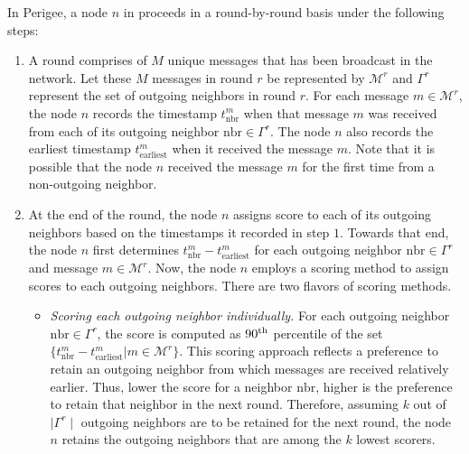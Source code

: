 \documentclass{article}
\begin{document}
In {\sf Perigee}, a node $n$ in proceeds in a round-by-round basis under the following steps:
\begin{enumerate}
    \item A round comprises of $M$ unique messages that has been broadcast in the network. Let these $M$ messages in round $r$ be represented by $\mathcal{M}^r$ and $\Gamma^r$ represent the set of outgoing neighbors in round $r$. For each message $m \in \mathcal{M}^r$, the node $n$ records the timestamp $t^m_{\text{nbr}}$ when that message $m$ was received from each of its outgoing neighbor $\text{nbr} \in \Gamma^r$. The node $n$ also records the earliest timestamp $t^m_{\text{earliest}}$ when it received the message $m$. Note that it is possible that the node $n$ received the message $m$ for the first time from a non-outgoing neighbor.
    \item At the end of the round, the node $n$ assigns score to each of its outgoing neighbors based on the timestamps it recorded in step $1$. Towards that end, the node $n$ first determines $t^m_{\text{nbr}} - t^m_{\text{earliest}}$ for each outgoing neighbor $\text{nbr} \in \Gamma^r$ and message $m \in \mathcal{M}^r$. Now, the node $n$ employs a scoring method to assign scores to each outgoing neighbors. There are two flavors of scoring methods. 
    \begin{itemize}
        \item \textit{Scoring each outgoing neighbor individually.} For each outgoing neighbor $\text{nbr} \in \Gamma^r$, the score is computed as $90\textsuperscript{th}$ percentile of the set $\{t^m_{\text{nbr}} - t^m_{\text{earliest}} \vert m \in \mathcal{M}^r\}$. This scoring approach  reflects a preference to retain an outgoing neighbor from which messages are received relatively earlier. Thus, lower the score for a neighbor $\text{nbr}$, higher is the preference to retain that neighbor in the next round. Therefore, assuming  $k$ out of $\mid \Gamma^r \mid$ outgoing neighbors are to be retained for the next round, the node $n$ retains the outgoing neighbors that are among the $k$ lowest scorers.

\end{itemize}
\end{enumerate}
\end{document}

